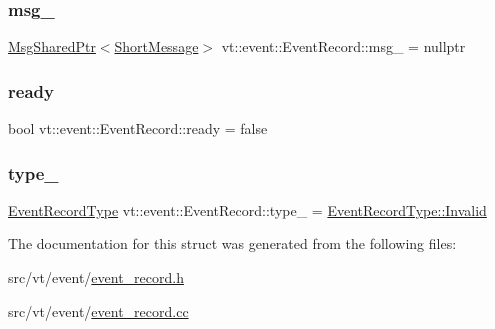\mbox{\label{structvt_1_1event_1_1_event_record_a5cffc5288d077e2e68c316134e486d32}} 
\subsubsection{\texorpdfstring{msg\+\_\+}{msg\_}}
{\footnotesize\ttfamily \hyperlink{namespacevt_ab2b3d506ec8e8d1540aede826d84a239}{Msg\+Shared\+Ptr}$<$\hyperlink{namespacevt_a1125ac1da6c0bbf141e0ea0739d7602d}{Short\+Message}$>$ vt\+::event\+::\+Event\+Record\+::msg\+\_\+ = nullptr\hspace{0.3cm}{\ttfamily [private]}}

\mbox{\label{structvt_1_1event_1_1_event_record_a5bbd2f1c9a7335ef4be44db273215f9a}} 
\subsubsection{\texorpdfstring{ready}{ready}}
{\footnotesize\ttfamily bool vt\+::event\+::\+Event\+Record\+::ready = false\hspace{0.3cm}{\ttfamily [private]}}

\mbox{\label{structvt_1_1event_1_1_event_record_a2b2684a996dd14b092ba3fef2fcce6b4}} 
\subsubsection{\texorpdfstring{type\+\_\+}{type\_}}
{\footnotesize\ttfamily \hyperlink{namespacevt_1_1event_a1ea9fec44d101bf40b8fd786d44ebed9}{Event\+Record\+Type} vt\+::event\+::\+Event\+Record\+::type\+\_\+ = \hyperlink{namespacevt_1_1event_a1ea9fec44d101bf40b8fd786d44ebed9a4bbb8f967da6d1a610596d7257179c2b}{Event\+Record\+Type\+::\+Invalid}\hspace{0.3cm}{\ttfamily [private]}}



The documentation for this struct was generated from the following files\+:\begin{DoxyCompactItemize}
\item 
src/vt/event/\hyperlink{event__record_8h}{event\+\_\+record.\+h}\item 
src/vt/event/\hyperlink{event__record_8cc}{event\+\_\+record.\+cc}\end{DoxyCompactItemize}
